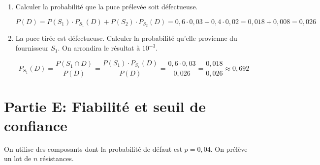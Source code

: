 \documentclass[11pt, a4paper]{report}
\begin{document}
\begin{enumerate}[resume]
\begin{minipage}{0.49\textwidth}
\begin{blocvisible}[height=5]
    \end{blocvisible}
\end{minipage}

\pagebreak
    \thispagestyle{DS_LP}

    \item Calculer la probabilité que la puce prélevée soit défectueuse.
    \begin{blocvisible}[height=1.5]
        \[P(D) = P(S_1) \cdot P_{S_1}(D) + P(S_2) \cdot P_{S_2}(D) = 0,6 \cdot 0,03 + 0,4 \cdot 0,02 = 0,018 + 0,008 = 0,026\]
    \end{blocvisible}
    \item La puce tirée est défectueuse. Calculer la probabilité qu'elle provienne du fournisseur $S_1$. On arrondira le résultat à $10^{-3}$.
    \begin{blocvisible}[height=1.5]
        \[P_{S_1}(D) = \frac{P(S_1 \cap D)}{P(D)} = \frac{P(S_1) \cdot P_{S_1}(D)}{P(D)} = \frac{0,6 \cdot 0,03}{0,026} = \frac{0,018}{0,026} \approx 0,692\]
    \end{blocvisible}

\end{enumerate}



\section*{Partie E\@: Fiabilité et seuil de confiance}

On utilise des composants dont la probabilité de défaut est $p = 0,04$. On prélève un lot de $n$ résistances.

\medskip
\end{document}
